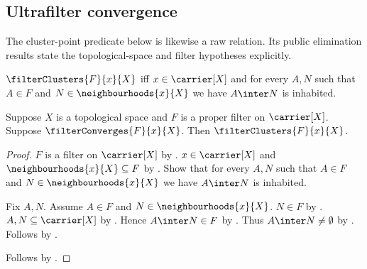\subsection{Ultrafilter convergence}

The cluster-point predicate below is likewise a raw relation.  Its public
elimination results state the topological-space and filter hypotheses
explicitly.

\begin{definition}\label{filter_cluster_point}
    $\filterClusters{F}{x}{X}$ iff $x\in\carrier[X]$ and
        for every $A,N$ such that $A\in F$ and
        $N\in\neighbourhoods{x}{X}$ we have $A\inter N$ is inhabited.
\end{definition}

\begin{proposition}\label{filter_convergence_implies_cluster_point}
    Suppose $X$ is a topological space and
        $F$ is a proper filter on $\carrier[X]$.
    Suppose $\filterConverges{F}{x}{X}$.
    Then $\filterClusters{F}{x}{X}$.
\end{proposition}
\begin{proof}
    $F$ is a filter on $\carrier[X]$ by .
    $x\in\carrier[X]$ and $\neighbourhoods{x}{X}\subseteq F$
        by .
    Show that for every $A,N$ such that $A\in F$ and
        $N\in\neighbourhoods{x}{X}$ we have $A\inter N$ is inhabited.
    \begin{subproof}
        Fix $A,N$.
        Assume $A\in F$ and $N\in\neighbourhoods{x}{X}$.
        $N\in F$ by .
        $A,N\subseteq\carrier[X]$ by .
        Hence $A\inter N\in F$ by .
        Thus $A\inter N\neq\emptyset$ by .
        Follows by .
    \end{subproof}
    Follows by .
\end{proof}

